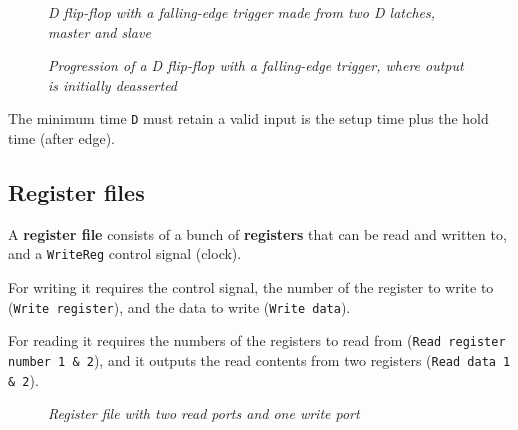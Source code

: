 \documentclass[11pt]{article}
\begin{document}
\begin{figure}[htbp]
    \centering
    \caption{\textit{D flip-flop with a falling-edge trigger made from two D latches, master and slave}}
    \vspace{1.5em}
    \centering
    \caption{\textit{Progression of a D flip-flop with a falling-edge trigger, where output is initially deasserted}}
\end{figure}

The minimum time \texttt{D} must retain a valid input is the setup time plus the hold time (after edge).

\subsection*{Register files}

A \textbf{register file} consists of a bunch of \textbf{registers} that can be read and written to, and a \texttt{WriteReg} control signal (clock).

For writing it requires the control signal, the number of the register to write to (\texttt{Write register}), and the data to write (\texttt{Write data}).

For reading it requires the numbers of the registers to read from (\texttt{Read register number 1 \& 2}), and it outputs the read contents from two registers (\texttt{Read data 1 \& 2}).

\begin{figure}[htbp]
    \centering
    \caption{\textit{Register file with two read ports and one write port}}
\end{figure}
\end{document}
